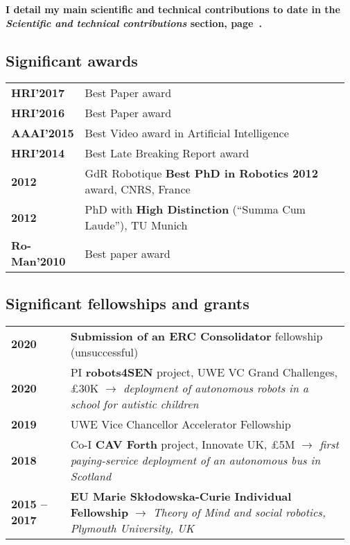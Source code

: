{\bf I detail my main scientific and technical contributions to date in the
\emph{Scientific and technical contributions} section, page~\pageref{sci-contribs}.}


\subsection{Significant awards}

\begin{tabular}{p{0.17\linewidth}p{0.8\linewidth}}
    \bf HRI'2017  & Best Paper award\\
    \bf HRI'2016  & Best Paper award\\
    \bf AAAI'2015  & Best Video award in Artificial Intelligence\\
    \bf HRI'2014  & Best Late Breaking Report award\\
    \bf 2012         & GdR Robotique {\bf Best PhD in Robotics 2012} award, CNRS, France \\
    \bf 2012         & PhD with {\bf High Distinction} (“Summa Cum Laude”), TU Munich\\
    \bf Ro-Man'2010  & Best paper award\\
\end{tabular}

\subsection{Significant fellowships and grants}

\begin{tabular}{p{0.17\linewidth}p{0.8\linewidth}}
    \bf 2020 & \textbf{Submission of an ERC Consolidator} fellowship (unsuccessful) \\
    \bf 2020 & PI \textbf{robots4SEN} project, UWE VC Grand Challenges, £30K
               \newline \emph{$\rightarrow$ deployment of autonomous robots in a school for autistic
               children}\\
    \bf 2019 & UWE Vice Chancellor Accelerator Fellowship \\
    \bf 2018 & Co-I \textbf{CAV Forth} project, Innovate UK, £5M 
               \newline \emph{$\rightarrow$ first paying-service deployment of an
               autonomous bus in Scotland}\\
    \bf 2015 -- 2017 & {\bf EU Marie Skłodowska-Curie Individual Fellowship}
    \newline \emph{$\rightarrow$ Theory of Mind and social robotics, Plymouth University, UK} \\
\end{tabular}

